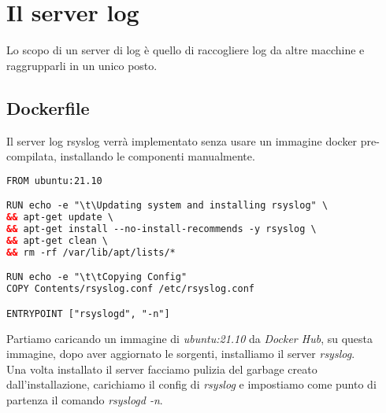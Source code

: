 \documentclass[../DocumentazioneProgetto.tex]{subfiles}
\begin{document}
	\section{Il server log} 
	Lo scopo di un server di log è quello di raccogliere log da altre macchine e raggrupparli in un unico posto.
\subsection{Dockerfile} 
\label{sec:RsyslogDockerfile}
Il server log rsyslog verrà implementato senza usare un immagine docker pre-compilata, installando le componenti manualmente.
\begin{lstlisting}[language=XML, caption=Dockerfile Rsyslog] 
FROM ubuntu:21.10

RUN echo -e "\t\Updating system and installing rsyslog" \
&& apt-get update \
&& apt-get install --no-install-recommends -y rsyslog \
&& apt-get clean \
&& rm -rf /var/lib/apt/lists/*

RUN echo -e "\t\tCopying Config"
COPY Contents/rsyslog.conf /etc/rsyslog.conf

ENTRYPOINT ["rsyslogd", "-n"]\end{lstlisting}
Partiamo caricando un immagine di \textit{ubuntu:21.10} da \textit{Docker Hub}, su questa immagine,
dopo aver aggiornato le sorgenti, installiamo il server \textit{rsyslog}.\\
Una volta installato il server facciamo pulizia del garbage creato dall'installazione, carichiamo il config di \textit{rsyslog} e
impostiamo come punto di partenza il comando \textit{rsyslogd -n}.  


\end{document}
